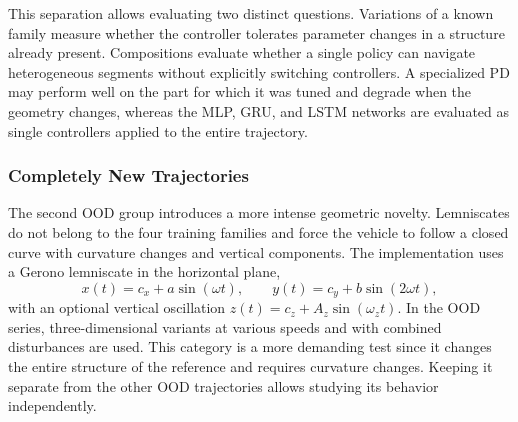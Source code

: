 This separation allows evaluating two distinct questions. Variations of a known family measure whether the controller tolerates parameter changes in a structure already present. Compositions evaluate whether a single policy can navigate heterogeneous segments without explicitly switching controllers. A specialized PD may perform well on the part for which it was tuned and degrade when the geometry changes, whereas the MLP, GRU, and LSTM networks are evaluated as single controllers applied to the entire trajectory.

\subsubsection*{Completely New Trajectories}
\label{subsubsec:trayectorias-nuevas-ood}

The second OOD group introduces a more intense geometric novelty. Lemniscates do not belong to the four training families and force the vehicle to follow a closed curve with curvature changes and vertical components. The implementation uses a Gerono lemniscate in the horizontal plane,
\begin{equation}
 x(t)=c_x+a\sin(\omega t),\qquad
 y(t)=c_y+b\sin(2\omega t),
\end{equation}
with an optional vertical oscillation $z(t)=c_z+A_z\sin(\omega_z t)$. In the OOD series, three-dimensional variants at various speeds and with combined disturbances are used. This category is a more demanding test since it changes the entire structure of the reference and requires curvature changes. Keeping it separate from the other OOD trajectories allows studying its behavior independently.
